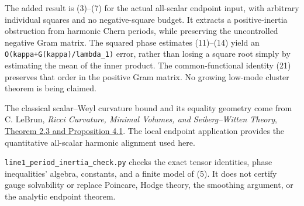 \documentclass[
  11pt,
]{article}
\begin{document}
The added result is (3)--(7) for the actual all-scalar endpoint input,
with arbitrary individual squares and no negative-square budget. It
extracts a positive-inertia obstruction from harmonic Chern periods,
while preserving the uncontrolled negative Gram matrix. The squared
phase estimates (11)--(14) yield an \texttt{O(kappa+G(kappa)/lambda\_1)}
error, rather than losing a square root simply by estimating the mean of
the inner product. The common-functional identity (21) preserves that
order in the positive Gram matrix. No growing low-mode cluster theorem
is being claimed.

The classical scalar--Weyl curvature bound and its equality geometry
come from C. LeBrun, \emph{Ricci Curvature, Minimal Volumes, and
Seiberg--Witten Theory},
\href{https://arxiv.org/abs/math/0003068}{Theorem 2.3 and Proposition
4.1}. The local endpoint application provides the quantitative
all-scalar harmonic alignment used here.

\texttt{line1\_period\_inertia\_check.py} checks the exact tensor
identities, phase inequalities' algebra, constants, and a finite model
of (5). It does not certify gauge solvability or replace Poincare, Hodge
theory, the smoothing argument, or the analytic endpoint theorem.
\end{document}
